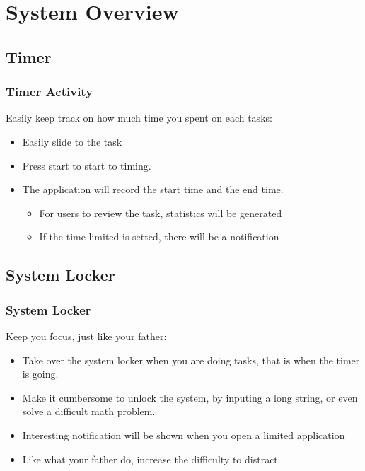 \documentclass{beamer}
\begin{document}
\section{System Overview}
\subsection{Timer}
\begin{frame}\frametitle{Timer Activity}
Easily keep track on how much time you spent on each tasks:
\pause
\begin{itemize}
\item Easily slide to the task
\pause
\item Press start to start to timing.
\pause
\item The application will record the start time and the end time.
\pause
  \begin{itemize}
    \item For users to review the task, statistics will be generated
    \item If the time limited is setted, there will be a notification 
  \end{itemize}
\end{itemize}
\end{frame}

\subsection{System Locker}
\begin{frame}\frametitle{System Locker}
Keep you focus, just like your father:
\begin{itemize}
\item Take over the system locker when you are doing tasks, that is when the timer is going.
\pause
\item Make it cumbersome to unlock the system, by inputing a long string, or
even solve a difficult math problem. 
\pause
\item Interesting notification will be shown when you open a limited application
\pause
\item Like what your father do, increase the difficulty to distract.
\end{itemize}
\end{frame}
\end{document}
